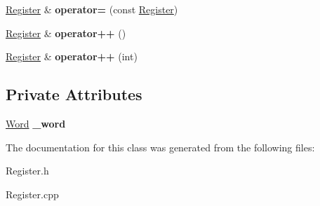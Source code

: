 \begin{DoxyCompactItemize}
\item 
\hypertarget{classRegister_a288eb773fe176bc479ea1a09ec5886a8}{
\hyperlink{classRegister}{Register} \& {\bfseries operator=} (const \hyperlink{classRegister}{Register})}
\label{classRegister_a288eb773fe176bc479ea1a09ec5886a8}

\item 
\hypertarget{classRegister_ac4e78cff131bc5c69695a9db5ca35255}{
\hyperlink{classRegister}{Register} \& {\bfseries operator++} ()}
\label{classRegister_ac4e78cff131bc5c69695a9db5ca35255}

\item 
\hypertarget{classRegister_ae3414befdccf70a18df0f67dc19d86b7}{
\hyperlink{classRegister}{Register} \& {\bfseries operator++} (int)}
\label{classRegister_ae3414befdccf70a18df0f67dc19d86b7}

\end{DoxyCompactItemize}
\subsection*{Private Attributes}
\begin{DoxyCompactItemize}
\item 
\hypertarget{classRegister_ad716faf568aba3da6e4acca6674f9ec9}{
\hyperlink{classWord}{Word} {\bfseries \_\-word}}
\label{classRegister_ad716faf568aba3da6e4acca6674f9ec9}

\end{DoxyCompactItemize}


The documentation for this class was generated from the following files:\begin{DoxyCompactItemize}
\item 
Register.h\item 
Register.cpp\end{DoxyCompactItemize}
